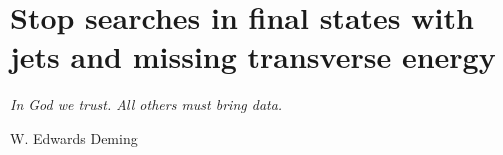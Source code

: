 \chapter{Stop searches in final states with jets and missing transverse energy}
\label{ch:stop_ana}
\epigraph{\emph{In God we trust. All others must bring data.}}{W. Edwards Deming}

